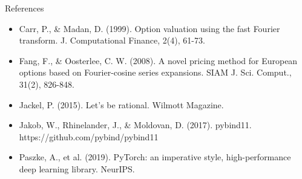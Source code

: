\documentclass[aspectratio=169,10pt]{beamer}
\begin{document}
\begin{frame}{References}
\scriptsize\begin{itemize}\setlength{\itemsep}{3pt}
  \item Carr, P., \& Madan, D. (1999). Option valuation using the fast Fourier transform. J. Computational Finance, 2(4), 61-73.
  \item Fang, F., \& Oosterlee, C. W. (2008). A novel pricing method for European options based on Fourier-cosine series expansions. SIAM J. Sci. Comput., 31(2), 826-848.
  \item Jackel, P. (2015). Let's be rational. Wilmott Magazine.
  \item Jakob, W., Rhinelander, J., \& Moldovan, D. (2017). pybind11. https://github.com/pybind/pybind11
  \item Paszke, A., et al. (2019). PyTorch: an imperative style, high-performance deep learning library. NeurIPS.
\end{itemize}
\end{frame}
\end{document}
